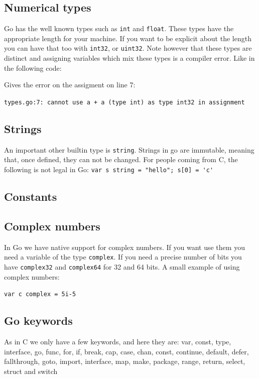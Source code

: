 \subsection{Numerical types}

Go has the well known types such as \lstinline{int} and
\lstinline{float}. These types have the appropriate length for your
machine. If you want to be explicit about the length you can have
that too with \lstinline{int32}, or \lstinline{uint32}. Note however
that these types are distinct and assigning variables which mix
these types is a compiler error. Like in the following code:


Gives the error on the assigment on line 7:

\noindent\lstinline{types.go:7: cannot use a + a (type int) as type int32 in assignment}

\subsection{Strings}

An important other builtin type is \lstinline{string}. Strings in go are
immutable, meaning that, once defined, they can not be changed. For
people coming from C, the following is not legal in Go:
\lstinline{var s string = "hello"; s[0] = 'c'} 

\subsection{Constants}

\subsection{Complex numbers}
In Go we have native support for complex numbers. If you 
want use them you need a variable of the type \lstinline{complex}. If
you need a precise number of bits you have \lstinline{complex32} and
\lstinline{complex64} for 32 and 64 bits. A small example of using complex numbers:

\lstinline{var c complex = 5i-5}

\subsection{Go keywords}
As in C we only have a few keywords, and here they are:
var, const, type, interface, go, func, for, if, break, cap,
case, chan, const, continue, default, defer, fallthrough, goto,
import, interface, map, make, package, range, return, select, struct and switch

